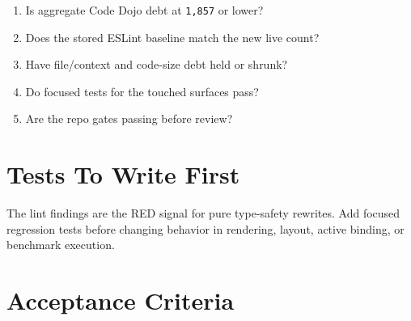 \begin{enumerate}
\def\labelenumi{\arabic{enumi}.}
\tightlist
\item
  Is aggregate Code Dojo debt at \texttt{1\allowbreak{},\allowbreak{}8\allowbreak{}5\allowbreak{}7} or lower?
\item
  Does the stored ESLint baseline match the new live count?
\item
  Have file/context and code-size debt held or shrunk?
\item
  Do focused tests for the touched surfaces pass?
\item
  Are the repo gates passing before review?
\end{enumerate}

\section{Tests To Write First}\label{record-220-tests-to-write-first}

The lint findings are the RED signal for pure type-safety rewrites. Add focused regression tests before changing behavior in rendering, layout, active binding, or benchmark execution.

\section{Acceptance Criteria}\label{record-220-acceptance-criteria}

